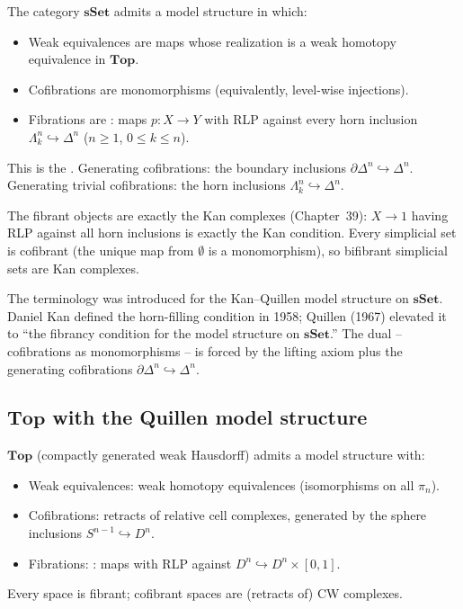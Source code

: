 \begin{theorem}
\label{thm:sset-quillen}
The category $\mathbf{sSet}$ admits a model structure in which:
\begin{itemize}
  \item Weak equivalences are maps whose realization is a weak homotopy
        equivalence in $\mathbf{Top}$.
  \item Cofibrations are monomorphisms (equivalently, level-wise
        injections).
  \item Fibrations are : maps $p : X \to Y$ with
        RLP against every horn inclusion $\Lambda^n_k \hookrightarrow
        \Delta^n$ ($n \geq 1$, $0 \leq k \leq n$).
\end{itemize}
This is the . Generating cofibrations:
the boundary inclusions $\partial\Delta^n \hookrightarrow \Delta^n$.
Generating trivial cofibrations: the horn inclusions $\Lambda^n_k
\hookrightarrow \Delta^n$.
\end{theorem}

\begin{remark}
The fibrant objects are exactly the Kan complexes (Chapter~39): $X \to 1$
having RLP against all horn inclusions is exactly the Kan condition.
Every simplicial set is cofibrant (the unique map from $\emptyset$ is a
monomorphism), so bifibrant simplicial sets are Kan complexes.
\end{remark}

\begin{nameorigin}
The  terminology was introduced for the Kan--Quillen
model structure on $\mathbf{sSet}$. Daniel Kan defined the horn-filling
condition in 1958; Quillen (1967) elevated it to ``the fibrancy
condition for the model structure on $\mathbf{sSet}$.'' The dual --
cofibrations as monomorphisms -- is forced by the lifting axiom plus the
generating cofibrations $\partial\Delta^n \hookrightarrow \Delta^n$.
\end{nameorigin}

\subsection{$\mathbf{Top}$ with the Quillen model structure}

\begin{theorem}
\label{thm:top-quillen}
$\mathbf{Top}$ (compactly generated weak Hausdorff) admits a model
structure with:
\begin{itemize}
  \item Weak equivalences: weak homotopy equivalences (isomorphisms on
        all $\pi_n$).
  \item Cofibrations: retracts of relative cell complexes, generated by
        the sphere inclusions $S^{n-1} \hookrightarrow D^n$.
  \item Fibrations: : maps with RLP against
        $D^n \hookrightarrow D^n \times [0, 1]$.
\end{itemize}
Every space is fibrant; cofibrant spaces are (retracts of) CW complexes.
\end{theorem}

